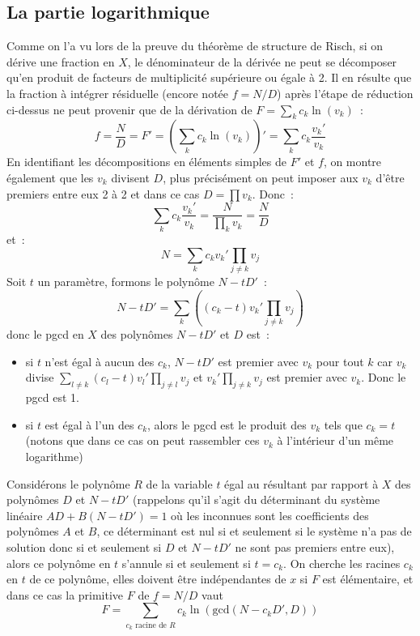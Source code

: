 \documentclass[a4paper,11pt]{book}
\begin{document}
\begin{giacjshere}
\subsection{La partie logarithmique}
Comme on l'a vu lors de la preuve du théorème de structure de Risch,
si on dérive une fraction en $X$, le dénominateur de la dérivée ne
peut se décomposer qu'en produit de facteurs de multiplicité supérieure
ou égale à 2. Il en résulte que la fraction à intégrer résiduelle (encore
notée $f=N/D$) après l'étape de réduction ci-dessus ne peut provenir que de la
dérivation de $F=\sum_k c_k \ln (v_k)$~:
\[ f=\frac{N}{D}=F'= (\sum_k c_k \ln (v_k))'= \sum_k c_k \frac{v_k'}{v_k}\]
En identifiant les décompositions
en éléments simples de $F'$ et $f$, on montre également que 
les $v_k$ divisent $D$, plus précisément on peut imposer aux $v_k$
d'être premiers entre eux 2 à 2 et dans ce cas $D=\prod v_k$. 
Donc~:
\[ \sum_k c_k \frac{v_k'}{v_k} = \frac{N}{\prod_k v_k}=\frac{N}{D}\]
et~:
\[ N = \sum_k c_k v_k' \prod_{j\neq k} v_j \]
Soit $t$ un paramètre, formons le polynôme $N-tD'$~:
\[ N-tD' = \sum_k \left( (c_k -t) v_k' \prod_{j\neq k} v_j \right) \]
donc le pgcd en $X$ des polynômes $N-tD'$ et $D$ est~:
\begin{itemize}
\item si $t$ n'est égal à aucun des $c_k$, $N-tD'$ est premier
avec $v_k$ pour tout $k$ car $v_k$ divise
$\sum_{l \neq k} (c_l -t) v_l' \prod_{j\neq l} v_j$
et $v_k'\prod_{j\neq k} v_j $ est premier avec $v_k$. Donc
le pgcd est 1.
\item si $t$ est égal à l'un des $c_k$, alors le pgcd est le produit
des $v_k$ tels que $c_k=t$ (notons que dans ce cas on peut
rassembler ces $v_k$ à l'intérieur d'un même logarithme)
\end{itemize}
Considérons le polynôme $R$ de la variable $t$ égal au résultant par rapport
à $X$ des polynômes $D$ et $N-tD'$ (rappelons qu'il s'agit du
d\'eterminant du syst\`eme lin\'eaire $AD+B(N-tD')=1$
o\`u les inconnues sont les coefficients des polyn\^omes $A$ et $B$, 
ce d\'eterminant est nul si et seulement si le syst\`eme n'a pas
de solution donc si et seulement si $D$ et $N-tD'$ ne sont pas
premiers entre eux), alors ce polynôme en $t$
s'annule si et seulement si $t=c_k$. 
On cherche les racines $c_k$ en $t$ de ce polynôme,
elles doivent être indépendantes de $x$ si $F$ est élémentaire,
et dans ce cas la primitive $F$ de $f=N/D$ vaut
\[ F=\sum_{c_k \mbox{ racine de } R} c_k \ln(\mbox{gcd}(N-c_k D',D)) \]


\end{giacjshere}
\end{document}
